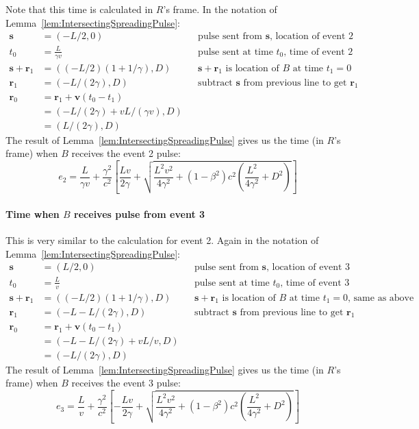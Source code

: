 \documentclass[a4paper]{article}
\theoremstyle{plain}
\theoremstyle{definition}
\newcommand{\vect}[1]{\mathbf{#1}}
\begin{document}
Note that this time is calculated in $R$'s frame.
In the notation of Lemma~\ref{lem:IntersectingSpreadingPulse}:
\begin{align*}
\vect{s} & = (-L/2, 0) & & \text{pulse sent from $\vect{s}$, location of event 2} \\
t_0 & = \frac{L}{\gamma v} & & \text{pulse sent at time $t_0$, time of event 2} \\
\vect{s} + \vect{r}_1 & = ((-L/2)(1+1/\gamma), D) & & \text{$\vect{s}+\vect{r}_1$ is location of $B$ at time $t_1=0$} \\
\vect{r}_1 & = (-L/(2 \gamma), D) & & \text{subtract $\vect{s}$ from previous line to get $\vect{r}_1$} \\
\vect{r}_0 & = \vect{r}_1 + \vect{v}(t_0-t_1) \\
           & = (-L/(2 \gamma) + vL/(\gamma v), D) \\
           & = (L/(2 \gamma), D)
\end{align*}
The result of Lemma~\ref{lem:IntersectingSpreadingPulse} gives us the
time (in $R$'s frame) when $B$ receives the event 2 pulse:
\begin{equation}
  e_2 = \frac{L}{\gamma v} +
        \frac{\gamma^2}{c^2} \left[ \frac{Lv}{2 \gamma} + \sqrt{ \frac{L^2v^2}{4 \gamma^2} + (1-\beta^2)c^2 (\frac{L^2}{4 \gamma^2} + D^2) } \right]
\label{eqn:Breceivespulse2}
\end{equation}

\paragraph{Time when $B$ receives pulse from event 3}

This is very similar to the calculation for event 2.
Again in the notation of Lemma~\ref{lem:IntersectingSpreadingPulse}:
\begin{align*}
\vect{s} & = (L/2, 0) & & \text{pulse sent from $\vect{s}$, location of event 3} \\
t_0 & = \frac{L}{v} & & \text{pulse sent at time $t_0$, time of event 3} \\
\vect{s} + \vect{r}_1 & = ((-L/2)(1+1/\gamma), D) & & \text{$\vect{s}+\vect{r}_1$ is location of $B$ at time $t_1=0$, same as above} \\
\vect{r}_1 & = (-L - L/(2 \gamma), D) & & \text{subtract $\vect{s}$ from previous line to get $\vect{r}_1$} \\
\vect{r}_0 & = \vect{r}_1 + \vect{v}(t_0-t_1) \\
           & = (-L - L/(2 \gamma) + vL/v, D) \\
           & = (-L/(2 \gamma), D)
\end{align*}
The result of Lemma~\ref{lem:IntersectingSpreadingPulse} gives us the
time (in $R$'s frame) when $B$ receives the event 3 pulse:
\begin{equation}
  e_3 = \frac{L}{v} +
        \frac{\gamma^2}{c^2} \left[ -\frac{Lv}{2 \gamma} + \sqrt{ \frac{L^2v^2}{4 \gamma^2} + (1-\beta^2)c^2 (\frac{L^2}{4 \gamma^2} + D^2) } \right]
\label{eqn:Breceivespulse3}
\end{equation}
\end{document}
